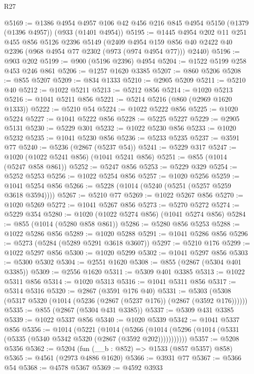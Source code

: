 \begin{lexlean}{R27}
\begin{coremodule}
@5169 := @1386
    @4954
    @4957
    @106
    @42
    @456
    @216
    @845
    @4954
    @5150
    (@1379 (@1396 @4957))
    (@933 (@1401 @4954))
@5195 := @1445
    @4954
    @202
    @11
    @251
    @455
    @856
    @5126
    @2396
    @5149
    (@2409 @4954 @159 @856 @40 @2422 @40 @2396 (@968 @4954 @77 @2302 (@973 (@974 @4954 @77))) @2440)
@5196 := @903 @202
@5199 := @900 (@5196 @2396) @4954
@5204 := @1522 @5199 @258 @453 @246 @861
@5206 := @1257 @1620 @3385
@5207 := @860 @5206
@5208 := @855 @5207
@5209 := @834 @1333
@5210 := @2905 @5209
@5211 := @5210 @40
@5212 := @1022 @5211
@5213 := @5212 @856
@5214 := @1020 @5213
@5216 := @1041 @5211 @856
@5221 := @5214 @5216 (@860 (@2969 @1620 @1333))
@5222 := @5210 @54
@5224 := @1022 @5222 @856
@5225 := @1020 @5224
@5227 := @1041 @5222 @856
@5228 := @5225 @5227
@5229 := @2905 @5131
@5230 := @5229 @301
@5232 := @1022 @5230 @856
@5233 := @1020 @5232
@5235 := @1041 @5230 @856
@5236 := @5233 @5235
@5237 := @3591 @77
@5240 := @5236 (@2867 (@5237 @54))
@5241 := @5229 @317
@5247 := @1020 (@1022 @5241 @856) (@1041 @5241 @856)
@5251 := @855 (@1014 (@5247 @858 @861))
@5252 := @5247 @856
@5253 := @5229 @329
@5254 := @5252 @5253
@5256 := @1022 @5254 @856
@5257 := @1020 @5256
@5259 := @1041 @5254 @856
@5266 := @5228 (@1014 (@5240 (@5251 (@5257 @5259 @3618 @3594))))
@5267 := @5210 @77
@5269 := @1022 @5267 @856
@5270 := @1020 @5269
@5272 := @1041 @5267 @856
@5273 := @5270 @5272
@5274 := @5229 @354
@5280 := @1020 (@1022 @5274 @856) (@1041 @5274 @856)
@5284 := @855 (@1014 (@5280 @858 @861))
@5286 := @5280 @856 @5253
@5288 := @1022 @5286 @856
@5289 := @1020 @5288
@5291 := @1041 @5286 @856
@5296 := @5273 (@5284 (@5289 @5291 @3618 @3607))
@5297 := @5210 @176
@5299 := @1022 @5297 @856
@5300 := @1020 @5299
@5302 := @1041 @5297 @856
@5303 := @5300 @5302
@5304 := @2551 @1620
@5308 := @855 (@2867 (@5304 @401 @3385))
@5309 := @2556 @1620
@5311 := @5309 @401 @3385
@5313 := @1022 @5311 @856
@5314 := @1020 @5313
@5316 := @1041 @5311 @856
@5317 := @5314 @5316
@5320 := @2867 (@3591 @176 @40)
@5331 := @5303 (@5308 (@5317 @5320 (@1014 (@5236 (@2867 (@5237 @176)) (@2867 (@3592 @176))))))
@5335 := @855 (@2867 (@5304 @431 @3385))
@5337 := @5309 @431 @3385
@5339 := @1022 @5337 @856
@5340 := @1020 @5339
@5342 := @1041 @5337 @856
@5356 := @1014
    (@5221
      (@1014
        (@5266 (@1014 (@5296 (@1014 (@5331 (@5335 (@5340 @5342 @5320 (@2867 (@3592 @202)))))))))))
@5357 := @5208 @5356
@5362 := @5204 (fun (__b : @852) => @1533 (@857 @5357) @858)
@5365 := @4561 (@2973 @4886 @1620)
@5366 := @3931 @77
@5367 := @5366 @54
@5368 := @4578 @5367
@5369 := @4592 @3933

\end{coremodule}
\end{lexlean}
